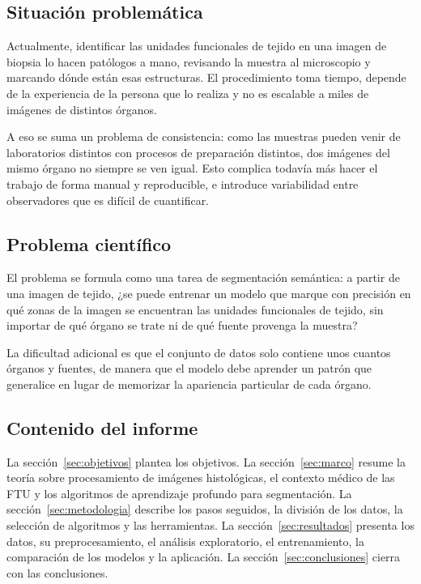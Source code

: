\documentclass[11pt,letterpaper]{article}
\begin{document}
\subsection{Situación problemática}

Actualmente, identificar las unidades funcionales de tejido en una imagen de biopsia lo hacen
patólogos a mano, revisando la muestra al microscopio y marcando dónde están esas estructuras. El
procedimiento toma tiempo, depende de la experiencia de la persona que lo realiza y no es escalable
a miles de imágenes de distintos órganos.

A eso se suma un problema de consistencia: como las muestras pueden venir de laboratorios distintos
con procesos de preparación distintos, dos imágenes del mismo órgano no siempre se ven igual. Esto
complica todavía más hacer el trabajo de forma manual y reproducible, e introduce variabilidad entre
observadores que es difícil de cuantificar.

\subsection{Problema científico}

El problema se formula como una tarea de segmentación semántica: a partir de una imagen de tejido,
¿se puede entrenar un modelo que marque con precisión en qué zonas de la imagen se encuentran las
unidades funcionales de tejido, sin importar de qué órgano se trate ni de qué fuente provenga la
muestra?

La dificultad adicional es que el conjunto de datos solo contiene unos cuantos órganos y fuentes, de
manera que el modelo debe aprender un patrón que generalice en lugar de memorizar la apariencia
particular de cada órgano.

\subsection{Contenido del informe}

La sección~\ref{sec:objetivos} plantea los objetivos. La sección~\ref{sec:marco} resume la teoría
sobre procesamiento de imágenes histológicas, el contexto médico de las FTU y los algoritmos de
aprendizaje profundo para segmentación. La sección~\ref{sec:metodologia} describe los pasos seguidos,
la división de los datos, la selección de algoritmos y las herramientas. La
sección~\ref{sec:resultados} presenta los datos, su preprocesamiento, el análisis exploratorio, el
entrenamiento, la comparación de los modelos y la aplicación. La sección~\ref{sec:conclusiones}
cierra con las conclusiones.
\end{document}
